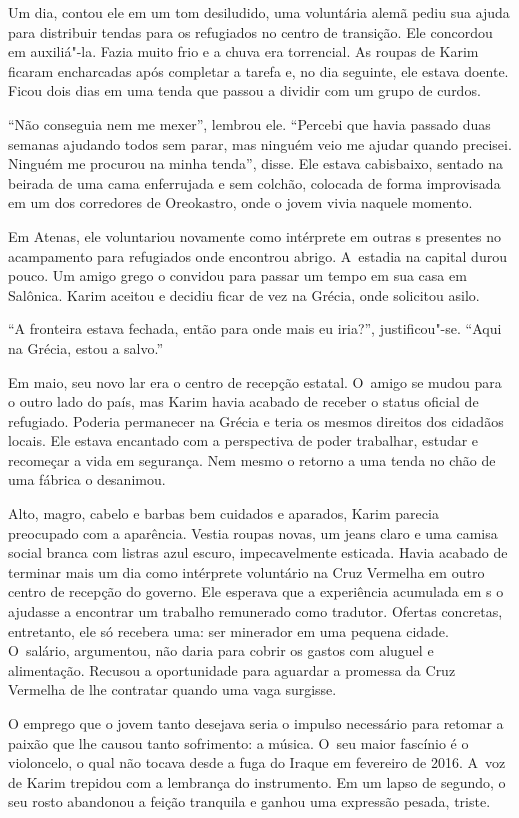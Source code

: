 Um dia, contou ele em um tom desiludido, uma voluntária alemã pediu sua
ajuda para distribuir tendas para os refugiados no centro de transição.
Ele concordou em auxiliá"-la. Fazia muito frio e a chuva era torrencial.
As roupas de Karim ficaram encharcadas após completar a tarefa e, no dia
seguinte, ele estava doente. Ficou dois dias em uma tenda que passou a
dividir com um grupo de curdos.

``Não conseguia nem me mexer'', lembrou ele. ``Percebi que havia passado
duas semanas ajudando todos sem parar, mas ninguém veio me ajudar quando
precisei. Ninguém me procurou na minha tenda'', disse. Ele estava
cabisbaixo, sentado na beirada de uma cama enferrujada e sem colchão,
colocada de forma improvisada em um dos corredores de Oreokastro, onde o
jovem vivia naquele momento.

Em Atenas, ele voluntariou novamente como intérprete em outras s
presentes no acampamento para refugiados onde encontrou abrigo. A~estadia na capital durou pouco. Um amigo grego o convidou para passar um
tempo em sua casa em Salônica. Karim aceitou e decidiu ficar de vez na
Grécia, onde solicitou asilo.

``A fronteira estava fechada, então para onde mais eu iria?'',
justificou"-se. ``Aqui na Grécia, estou a salvo.''

Em maio, seu novo lar era o centro de recepção estatal. O~amigo se mudou
para o outro lado do país, mas Karim havia acabado de receber o status
oficial de refugiado. Poderia permanecer na Grécia e teria os mesmos
direitos dos cidadãos locais. Ele estava encantado com a perspectiva de
poder trabalhar, estudar e recomeçar a vida em segurança. Nem mesmo o
retorno a uma tenda no chão de uma fábrica o desanimou. 

Alto, magro, cabelo e barbas bem cuidados e aparados, Karim parecia
preocupado com a aparência. Vestia roupas novas, um jeans claro e uma
camisa social branca com listras azul escuro, impecavelmente esticada.
Havia acabado de terminar mais um dia como intérprete voluntário na Cruz
Vermelha em outro centro de recepção do governo. Ele esperava que a
experiência acumulada em s o ajudasse a encontrar um trabalho
remunerado como tradutor. Ofertas concretas, entretanto, ele só recebera
uma: ser minerador em uma pequena cidade. O~salário, argumentou, não
daria para cobrir os gastos com aluguel e alimentação. Recusou a
oportunidade para aguardar a promessa da Cruz Vermelha de lhe contratar
quando uma vaga surgisse.

O emprego que o jovem tanto desejava seria o impulso necessário para
retomar a paixão que lhe causou tanto sofrimento: a música. O~seu maior
fascínio é o violoncelo, o qual não tocava desde a fuga do Iraque em
fevereiro de 2016. A~voz de Karim trepidou com a lembrança do
instrumento. Em um lapso de segundo, o seu rosto abandonou a feição
tranquila e ganhou uma expressão pesada, triste.

